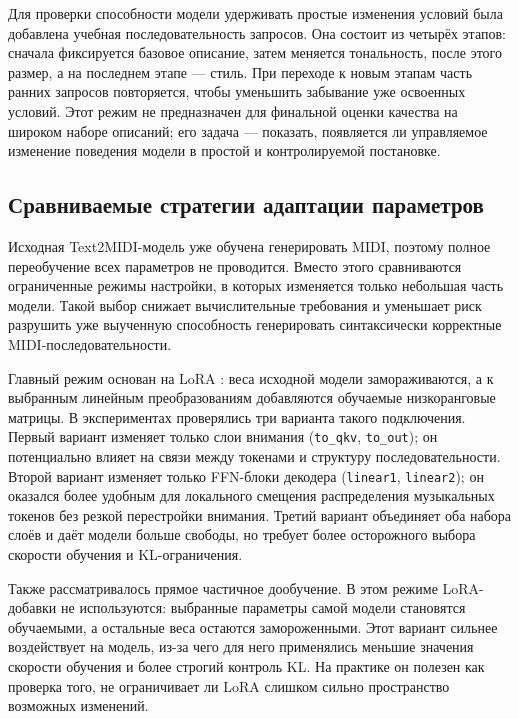 \documentclass[a4paper,12pt]{extarticle}
\begin{document}
Для проверки способности модели удерживать простые изменения условий была
добавлена учебная последовательность запросов. Она состоит из четырёх
этапов: сначала фиксируется базовое описание, затем меняется тональность,
после этого размер, а на последнем этапе --- стиль. При переходе к новым
этапам часть ранних запросов повторяется, чтобы уменьшить забывание уже
освоенных условий. Этот режим не предназначен для финальной оценки качества
на широком наборе описаний; его задача --- показать, появляется ли управляемое
изменение поведения модели в простой и контролируемой постановке.

\subsection{Сравниваемые стратегии адаптации параметров}

Исходная Text2MIDI-модель уже обучена генерировать MIDI, поэтому полное
переобучение всех параметров не проводится. Вместо этого сравниваются
ограниченные режимы настройки, в которых изменяется только небольшая часть
модели. Такой выбор снижает вычислительные требования и уменьшает риск разрушить уже
выученную способность генерировать синтаксически корректные
MIDI-последовательности.

Главный режим основан на LoRA \cite{hu2021lora}: веса исходной модели
замораживаются, а к выбранным линейным преобразованиям добавляются обучаемые
низкоранговые матрицы. В экспериментах проверялись три варианта такого
подключения. Первый вариант изменяет только слои внимания
(\texttt{to\_qkv}, \texttt{to\_out}); он потенциально влияет на связи между
токенами и структуру последовательности. Второй вариант изменяет только
FFN-блоки декодера (\texttt{linear1}, \texttt{linear2}); он оказался
более удобным для локального смещения распределения музыкальных токенов без
резкой перестройки внимания. Третий вариант объединяет оба набора слоёв и
даёт модели больше свободы, но требует более осторожного выбора скорости
обучения и KL-ограничения.

Также рассматривалось прямое частичное дообучение. В этом режиме
LoRA-добавки не используются: выбранные параметры самой модели становятся
обучаемыми, а остальные веса остаются замороженными. Этот вариант сильнее
воздействует на модель, из-за чего для него применялись меньшие значения скорости обучения и
более строгий контроль KL. На практике он полезен как проверка того, не
ограничивает ли LoRA слишком сильно пространство возможных изменений.
\end{document}
